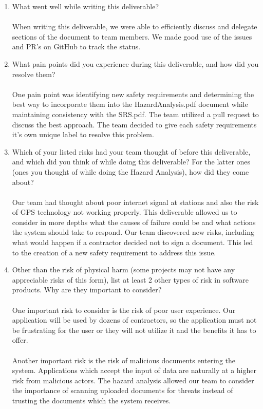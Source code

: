 \documentclass{article}
\begin{document}


\begin{enumerate}
  \item What went well while writing this deliverable?\\
    \\
    When writing this deliverable, we were able to efficiently discuss and
    delegate sections of the document to team members. We made good use of the
    issues and PR's on GitHub to track the status.
  \item What pain points did you experience during this deliverable, and how
    did you resolve them?\\
    \\
    One pain point was identifying new safety requirements and determining
    the best way to incorporate them into the HazardAnalysis.pdf
    document while maintaining
    consistency with the SRS.pdf. The team utilized a pull request to discuss
    the best approach. The team decided to give each safety requirements it's
    own unique label to resolve this problem.
  \item Which of your listed risks had your team thought of before this
    deliverable, and which did you think of while doing this deliverable? For
    the latter ones (ones you thought of while doing the Hazard Analysis), how
    did they come about?\\
    \\
    Our team had thought about poor internet signal at stations and also the
    risk of GPS technology not working properly. This deliverable allowed us to
    consider in more depths what the causes of failure could be and what actions
    the system should take to respond. Our team discovered new risks, including
    what would happen if a contractor decided not to sign a document. This led
    to the creation of a new safety requirement to address this issue.
  \item Other than the risk of physical harm (some projects may not have any
    appreciable risks of this form), list at least 2 other types of risk in
    software products. Why are they important to consider?\\
    \\
    One important risk to consider is the risk of poor user
    experience. Our application
    will be used by dozens of contractors, so the application
    must not be frustrating for the user or they will not utilize it
    and the benefits it has to offer.\\
    \\
    Another important risk is the risk of malicious documents entering the
    system. Applications which accept the input of data are naturally
    at a higher risk from malicious actors. The hazard analysis allowed our
    team to consider the importance of scanning uploaded documents for threats
    instead of trusting the documents which the system receives.
\end{enumerate}
\end{document}
